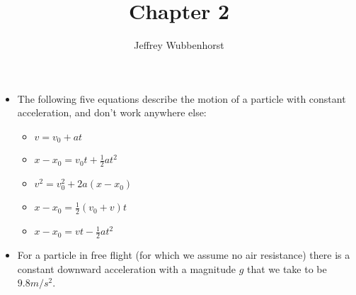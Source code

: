 \documentclass[12pt,letterpaper]{article}
\author{Jeffrey Wubbenhorst}
\title{Chapter 2}
\begin{document}
\maketitle

\begin{itemize}
\item 
The following five equations describe the motion of a particle with constant acceleration, and don't work anywhere else: 
\begin{itemize}
\item $v=v_0+at$ 
\item $x-x_0=v_0t+\frac{1}{2}at^2$ 
\item $v^2=v_0^2+2a(x-x_0)$ 
\item $x-x_0=\frac{1}{2}(v_0+v)t$ 
\item $x-x_0=vt-\frac{1}{2}at^2$

\end{itemize}

\item For a particle in free flight (for which we assume no air resistance) there is a constant downward acceleration with a magnitude $g$ that we take to be $9.8 m/s^2$. 

\end{itemize}
\end{document}
